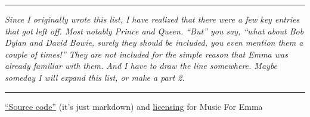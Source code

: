 \documentclass[letterpaper,]{article}
\begin{document}
\begin{center}\rule{0.5\linewidth}{\linethickness}\end{center}

\emph{Since I originally wrote this list, I have realized that there
were a few key entries that got left off. Most notably Prince and Queen.
``But'' you say, ``what about Bob Dylan and David Bowie, surely they
should be included, you even mention them a couple of times!'' They are
not included for the simple reason that Emma was already familiar with
them. And I have to draw the line somewhere. Maybe someday I will expand
this list, or make a part 2.}

\begin{center}\rule{0.5\linewidth}{\linethickness}\end{center}

\href{http://github.com/grannycart/musicforemma/}{``Source code''} (it's
just markdown) and
\href{https://github.com/grannycart/musicforemma/blob/main/LICENSE.txt}{licensing}
for Music For Emma
\end{document}
